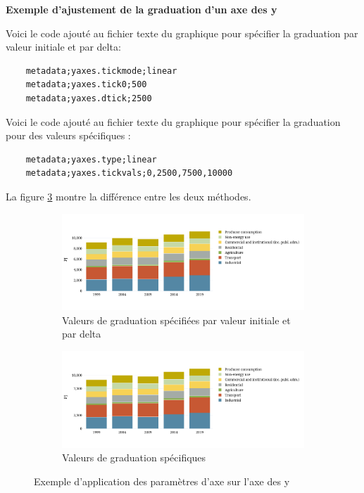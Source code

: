 \documentclass[11pt]{article}
\begin{document}
\vspace{0.2cm}
\textbf{Exemple d'ajustement de la graduation d'un axe des y}

Voici le code ajouté au fichier texte du graphique pour spécifier la graduation par valeur initiale et par delta:

\begin{lstlisting}
    metadata;yaxes.tickmode;linear
    metadata;yaxes.tick0;500
    metadata;yaxes.dtick;2500
\end{lstlisting}

Voici le code ajouté au fichier texte du graphique pour spécifier la graduation pour des valeurs spécifiques :

\begin{lstlisting}
    metadata;yaxes.type;linear
    metadata;yaxes.tickvals;0,2500,7500,10000
\end{lstlisting}

La figure \ref{fig:exempleGraduation} montre la différence entre les deux méthodes.

\begin{figure}[h]
    \centering
    \begin{subfigure}{\textwidth}
      \centering
      \includegraphics[width=\linewidth]{assets/fig3.2_linear_tickmode.png}
      \caption{Valeurs de graduation spécifiées par valeur initiale et par delta}
      \label{fig:grad1}
    \end{subfigure}%
    
    \begin{subfigure}{\textwidth}
      \centering
      \includegraphics[width=\linewidth]{assets/fig3.2_linear_tickvals.png}
      \caption{Valeurs de graduation spécifiques}
      \label{fig:grad2}
    \end{subfigure}
    \caption{Exemple d'application des paramètres d'axe sur l'axe des y}
    \label{fig:exempleGraduation}
    \end{figure}
\end{document}
